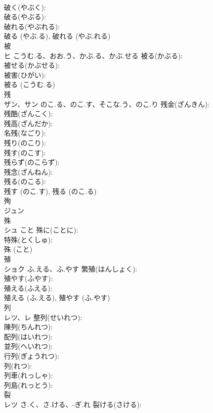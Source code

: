 \documentclass[8pt]{extreport}
\begin{document}
\begin{CJK}{UTF8}{min}
\\	破く(やぶく): 
\\	破る(やぶる): 
\\	破れる(やぶれる): 
\\	破る (やぶ.る), 破れる (やぶ.れる)
\\	被			
\\	ヒ	こうむ.る、おお.う、かぶ.る、かぶ.せる	被る(かぶる): 
\\	被せる(かぶせる): 
\\	被害(ひがい): 
\\	被る (こうむ.る)
\\	残			
\\	ザン、サン	のこ.る、のこ.す、そこな.う、のこ.り	残金(ざんきん): 
\\	残酷(ざんこく): 
\\	残高(ざんだか): 
\\	名残(なごり): 
\\	残り(のこり): 
\\	残す(のこす): 
\\	残らず(のこらず): 
\\	残念(ざんねん): 
\\	残る(のこる): 
\\	残す (のこ.す), 残る (のこ.る)
\\	殉			
\\	ジュン			
\\	殊			
\\	シュ	こと	殊に(ことに): 
\\	特殊(とくしゅ): 
\\	殊 (こと)
\\	殖			
\\	ショク	ふ.える、ふ.やす	繁殖(はんしょく): 
\\	殖やす(ふやす): 
\\	殖える(ふえる): 
\\	殖える (ふ.える), 殖やす (ふ.やす)
\\	列			
\\	レツ、レ		整列(せいれつ): 
\\	陳列(ちんれつ): 
\\	配列(はいれつ): 
\\	並列(へいれつ): 
\\	行列(ぎょうれつ): 
\\	列(れつ): 
\\	列車(れっしゃ): 
\\	列島(れっとう): 
\\	裂			
\\	レツ	さ.く、さ.ける、-ぎ.れ	裂ける(さける): 

\end{CJK}
\end{document}
